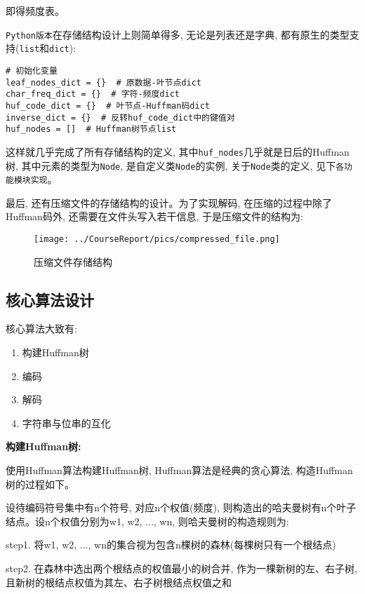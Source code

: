 \documentclass[a4paper]{ctexart}
\begin{document}
即得频度表。

\texttt{Python版本}在存储结构设计上则简单得多, 无论是列表还是字典, 都有原生的类型支持(\texttt{list}和\texttt{dict}):

{\setmainfont{Courier New Bold}              
\begin{lstlisting}
# 初始化变量
leaf_nodes_dict = {}  # 原数据-叶节点dict
char_freq_dict = {}  # 字符-频度dict
huf_code_dict = {}  # 叶节点-Huffman码dict
inverse_dict = {}  # 反转huf_code_dict中的键值对
huf_nodes = []  # Huffman树节点list
\end{lstlisting}}

这样就几乎完成了所有存储结构的定义, 其中\texttt{huf\_nodes}几乎就是日后的Huffman树, 其中元素的类型为\texttt{Node}, 是自定义类\texttt{Node}的实例, 关于\texttt{Node}类的定义, 见下\texttt{各功能模块实现}。

最后, 还有压缩文件的存储结构的设计。为了实现解码, 在压缩的过程中除了Huffman码外, 还需要在文件头写入若干信息, 于是压缩文件的结构为:

\begin{figure}[H]
\centering
\texttt{[image: ../CourseReport/pics/compressed\_file.png]}
\caption{压缩文件存储结构}
\end{figure}

\subsection{核心算法设计}\label{header-n190}

核心算法大致有:

\begin{enumerate}
\def\labelenumi{\arabic{enumi}.}
\item
  构建Huffman树
\item
  编码
\item
  解码
\item
  字符串与位串的互化
\end{enumerate}

\textbf{构建Huffman树:}

使用Huffman算法构建Huffman树, Huffman算法是经典的贪心算法, 构造Huffman树的过程如下。

设待编码符号集中有n个符号, 对应n个权值(频度), 则构造出的哈夫曼树有n个叶子结点。设n个权值分别为w1, w2, ..., wn, 则哈夫曼树的构造规则为:

step1. 将w1, w2, ..., wn的集合视为包含n棵树的森林(每棵树只有一个根结点)

step2. 在森林中选出两个根结点的权值最小的树合并, 作为一棵新树的左、右子树, 且新树的根结点权值为其左、右子树根结点权值之和
\end{document}
